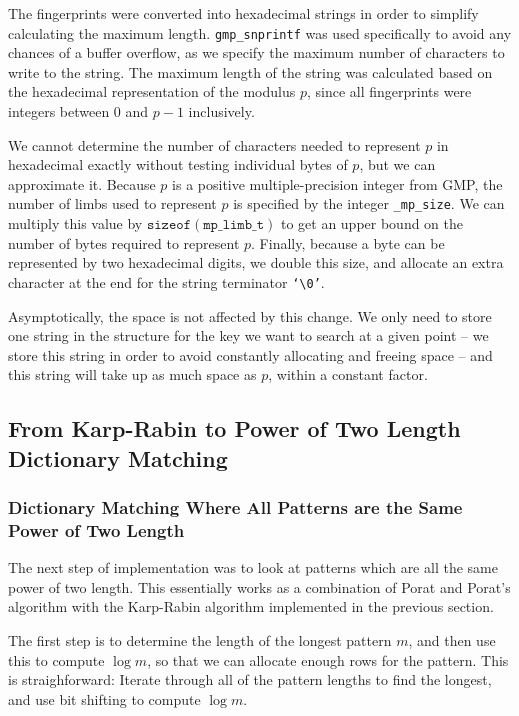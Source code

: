 \documentclass[ %
                    author={Dominic Joseph Moylett},
                    degree={MEng},
                     title={Dictionary Matching with Fingerprints},
                  subtitle={An Empirical Analysis},
                      type={research},
                      year={2015} ]{dissertation}
\begin{document}
The fingerprints were converted into hexadecimal strings in order to simplify calculating the maximum length. \texttt{gmp\_snprintf} was used specifically to avoid any chances of a buffer overflow, as we specify the maximum number of characters to write to the string. The maximum length of the string was calculated based on the hexadecimal representation of the modulus $p$, since all fingerprints were integers between 0 and $p - 1$ inclusively.

We cannot determine the number of characters needed to represent $p$ in hexadecimal exactly without testing individual bytes of $p$, but we can approximate it. Because $p$ is a positive multiple-precision integer from GMP, the number of limbs used to represent $p$ is specified by the integer \texttt{\_mp\_size}. We can multiply this value by $\texttt{sizeof}(\texttt{mp\_limb\_t})$ to get an upper bound on the number of bytes required to represent $p$. Finally, because a byte can be represented by two hexadecimal digits, we double this size, and allocate an extra character at the end for the string terminator \texttt{`\textbackslash0'}.

Asymptotically, the space is not affected by this change. We only need to store one string in the structure for the key we want to search at a given point -- we store this string in order to avoid constantly allocating and freeing space -- and this string will take up as much space as $p$, within a constant factor.

\subsection{From Karp-Rabin to Power of Two Length Dictionary Matching}

\subsubsection{Dictionary Matching Where All Patterns are the Same Power of Two Length}

The next step of implementation was to look at patterns which are all the same power of two length. This essentially works as a combination of Porat and Porat's algorithm with the Karp-Rabin algorithm implemented in the previous section.

The first step is to determine the length of the longest pattern $m$, and then use this to compute $\log m$, so that we can allocate enough rows for the pattern. This is straighforward: Iterate through all of the pattern lengths to find the longest, and use bit shifting to compute $\log m$.
\end{document}
